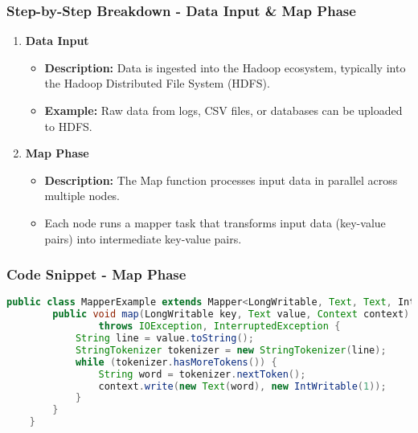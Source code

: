 \documentclass[aspectratio=169]{beamer}
\begin{document}
\begin{frame}
    \frametitle{Step-by-Step Breakdown - Data Input & Map Phase}
    \begin{enumerate}
        \item \textbf{Data Input}
        \begin{itemize}
            \item \textbf{Description:} Data is ingested into the Hadoop ecosystem, typically into the Hadoop Distributed File System (HDFS).
            \item \textbf{Example:} Raw data from logs, CSV files, or databases can be uploaded to HDFS.
        \end{itemize}

        \item \textbf{Map Phase}
        \begin{itemize}
            \item \textbf{Description:} The Map function processes input data in parallel across multiple nodes.
            \item Each node runs a mapper task that transforms input data (key-value pairs) into intermediate key-value pairs.
        \end{itemize}
    \end{enumerate}
\end{frame}

\begin{frame}[fragile]
    \frametitle{Code Snippet - Map Phase}
    \begin{lstlisting}[language=Java]
    public class MapperExample extends Mapper<LongWritable, Text, Text, IntWritable> {
        public void map(LongWritable key, Text value, Context context) 
                throws IOException, InterruptedException {
            String line = value.toString();
            StringTokenizer tokenizer = new StringTokenizer(line);
            while (tokenizer.hasMoreTokens()) {
                String word = tokenizer.nextToken();
                context.write(new Text(word), new IntWritable(1));
            }
        }
    }
    \end{lstlisting}
\end{frame}
\end{document}
